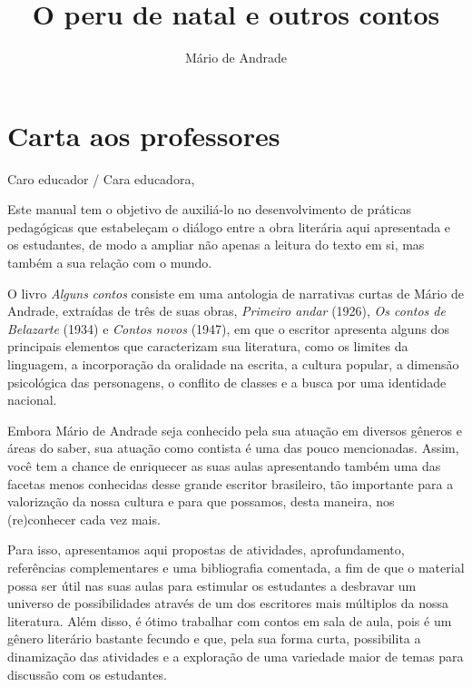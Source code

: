 \documentclass{article}
\begin{document}
\newcommand{\AutorLivro}{Mário de Andrade}
\newcommand{\TituloLivro}{O peru de natal e outros contos}
\newcommand{\Tema}{Ficção, mistério e fantasia}
\newcommand{\Genero}{Conto, crônica e novela}
\newcommand{\issnppub}{---}
\newcommand{\issnepub}{---}
\newcommand{\colaborador}{\textbf{Rodrigo Jorge Ribeiro Neves} é uma pessoa incrível e vai fazer um bom serviço.}


\title{\TituloLivro}
\author{\AutorLivro}
\def\authornotes{\colaborador}

\date{}
\maketitle
\tableofcontents

\pagebreak

\section{Carta aos professores}

Caro educador / Cara educadora,\\\bigskip

Este manual tem o objetivo de auxiliá-lo no desenvolvimento de práticas
pedagógicas que estabeleçam o diálogo entre a obra literária aqui
apresentada e os estudantes, de modo a ampliar não apenas a leitura do
texto em si, mas também a sua relação com o mundo.

O livro \emph{Alguns} \emph{contos} consiste em uma antologia de
narrativas curtas de Mário de Andrade, extraídas de três de suas obras,
\emph{Primeiro andar} (1926), \emph{Os contos de Belazarte} (1934) e
\emph{Contos novos} (1947), em que o escritor apresenta alguns dos
principais elementos que caracterizam sua literatura, como os limites da
linguagem, a incorporação da oralidade na escrita, a cultura popular, a
dimensão psicológica das personagens, o conflito de classes e a busca
por uma identidade nacional.

Embora Mário de Andrade seja conhecido pela sua atuação em diversos
gêneros e áreas do saber, sua atuação como contista é uma das pouco
mencionadas. Assim, você tem a chance de enriquecer as suas aulas
apresentando também uma das facetas menos conhecidas desse grande
escritor brasileiro, tão importante para a valorização da nossa cultura
e para que possamos, desta maneira, nos (re)conhecer cada vez mais.

Para isso, apresentamos aqui propostas de atividades, aprofundamento,
referências complementares e uma bibliografia comentada, a fim de que o
material possa ser útil nas suas aulas para estimular os estudantes a
desbravar um universo de possibilidades através de um dos escritores
mais múltiplos da nossa literatura. Além disso, é ótimo trabalhar com
contos em sala de aula, pois é um gênero literário bastante fecundo e
que, pela sua forma curta, possibilita a dinamização das atividades e a
exploração de uma variedade maior de temas para discussão com os
estudantes.
\end{document}
